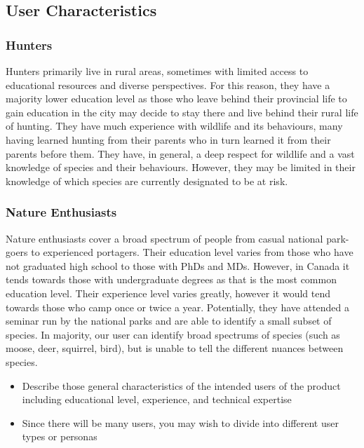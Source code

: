 \documentclass[]{article}
\begin{document}
\subsection{User Characteristics}
\label{sub:user_characteristics}
\subsubsection{Hunters}
Hunters primarily live in rural areas, sometimes with limited access to educational resources and diverse perspectives. For this reason, they have a majority lower education level 
as those who leave behind their provincial life to gain education in the city may decide to stay there and live behind their rural life of hunting. They have much experience with
 wildlife and its behaviours, many having learned hunting from their parents who in turn learned it from their parents before them. They have, in general,
 a deep respect for wildlife and a vast knowledge of species and their behaviours. However, they may be limited in their knowledge of which species are 
 currently designated to be at risk.
\subsubsection{Nature Enthusiasts}
Nature enthusiasts cover a broad spectrum of people from casual national park-goers to experienced portagers. Their education level varies from those 
who have not graduated high school to those with PhDs and MDs. However, in Canada it tends towards those with undergraduate degrees as that is the most 
common education level. Their experience level varies greatly, however it would tend towards those who camp once or twice a year. Potentially, they have attended 
a seminar run by the national parks and are able to identify a small subset of species. In majority, our user can identify broad spectrums of species (such as moose,
deer, squirrel, bird), but is unable to tell the different nuances between species.
\begin{itemize}
	\item Describe those general characteristics of the intended users of the product including educational level, experience, and technical expertise 
	\item Since there will be many users, you may wish to divide into different user types or personas
\end{itemize}
\end{document}
